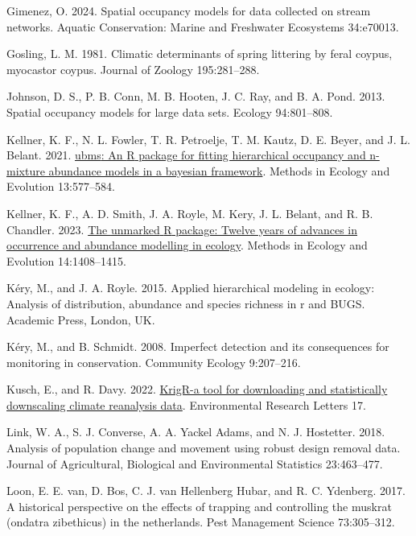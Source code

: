 \documentclass[
  11pt,
  a4paper,
]{article}
\newlength{\cslhangindent}
\newenvironment{CSLReferences}[2] %
 {\begin{list}{}{%
  \setlength{\itemindent}{0pt}
  \setlength{\leftmargin}{0pt}
  \setlength{\parsep}{0pt}
  \ifodd #1
   \setlength{\leftmargin}{\cslhangindent}
   \setlength{\itemindent}{-1\cslhangindent}
  \fi
  \setlength{\itemsep}{#2\baselineskip}}}
 {\end{list}}
\begin{document}
\begin{CSLReferences}{1}{0}
Gimenez, O. 2024. Spatial occupancy models for data collected on stream networks. Aquatic Conservation: Marine and Freshwater Ecosystems 34:e70013.

Gosling, L. M. 1981. Climatic determinants of spring littering by feral coypus, myocastor coypus. Journal of Zoology 195:281--288.

Johnson, D. S., P. B. Conn, M. B. Hooten, J. C. Ray, and B. A. Pond. 2013. Spatial occupancy models for large data sets. Ecology 94:801--808.

Kellner, K. F., N. L. Fowler, T. R. Petroelje, T. M. Kautz, D. E. Beyer, and J. L. Belant. 2021. \href{https://doi.org/10.1111/2041-210X.13777}{{ubms}: An {R} package for fitting hierarchical occupancy and n-mixture abundance models in a bayesian framework}. Methods in Ecology and Evolution 13:577--584.

Kellner, K. F., A. D. Smith, J. A. Royle, M. Kery, J. L. Belant, and R. B. Chandler. 2023. \href{https://www.jstatsoft.org/v43/i10/}{The {unmarked} {R} package: Twelve years of advances in occurrence and abundance modelling in ecology}. Methods in Ecology and Evolution 14:1408--1415.

Kéry, M., and J. A. Royle. 2015. Applied hierarchical modeling in ecology: Analysis of distribution, abundance and species richness in r and BUGS. Academic Press, London, UK.

Kéry, M., and B. Schmidt. 2008. Imperfect detection and its consequences for monitoring in conservation. Community Ecology 9:207--216.

Kusch, E., and R. Davy. 2022. \href{https://doi.org/10.1088/1748-9326/ac48b3}{KrigR-a tool for downloading and statistically downscaling climate reanalysis data}. Environmental Research Letters 17.

Link, W. A., S. J. Converse, A. A. Yackel Adams, and N. J. Hostetter. 2018. Analysis of population change and movement using robust design removal data. Journal of Agricultural, Biological and Environmental Statistics 23:463--477.

Loon, E. E. van, D. Bos, C. J. van Hellenberg Hubar, and R. C. Ydenberg. 2017. A historical perspective on the effects of trapping and controlling the muskrat (ondatra zibethicus) in the netherlands. Pest Management Science 73:305--312.


\end{CSLReferences}
\end{document}
